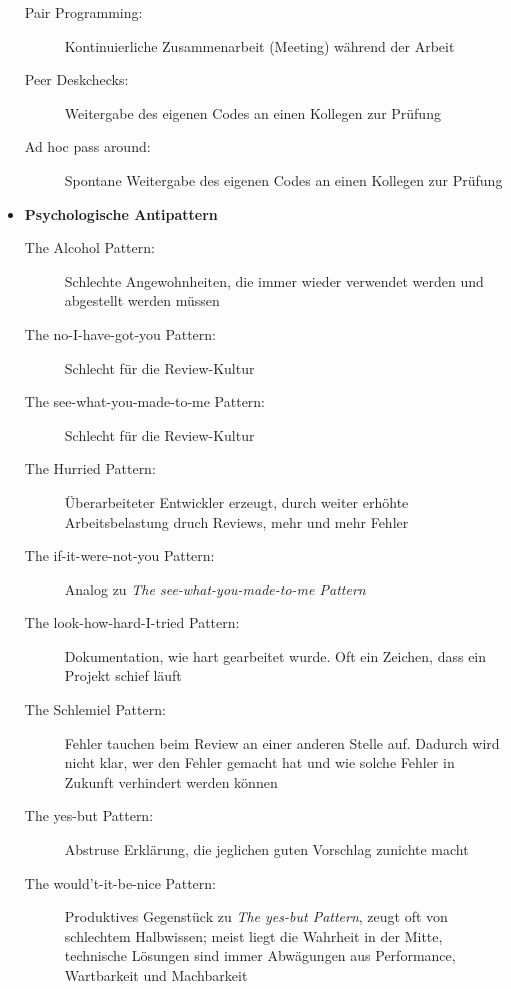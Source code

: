 \begin{itemize}
\begin{description}
		\item[Pair Programming:] Kontinuierliche Zusammenarbeit (Meeting) während der Arbeit
		\item[Peer Deskchecks:] Weitergabe des eigenen Codes an einen Kollegen zur Prüfung
		\item[Ad hoc pass around:] Spontane Weitergabe des eigenen Codes an einen Kollegen zur Prüfung
	\end{description}
	\item \textbf{Psychologische Antipattern}
	\begin{description}
		\item[The Alcohol Pattern:] Schlechte Angewohnheiten, die immer wieder verwendet werden und abgestellt werden müssen
		\item[The no-I-have-got-you Pattern:] Schlecht für die Review-Kultur
		\item[The see-what-you-made-to-me Pattern:] Schlecht für die Review-Kultur
		\item[The Hurried Pattern:] Überarbeiteter Entwickler erzeugt, durch weiter erhöhte Arbeitsbelastung druch Reviews, mehr und mehr Fehler
		\item[The if-it-were-not-you Pattern:] Analog zu \textit{The see-what-you-made-to-me Pattern}
		\item[The look-how-hard-I-tried Pattern:] Dokumentation, wie hart gearbeitet wurde. Oft ein Zeichen, dass ein Projekt schief läuft
		\item[The Schlemiel Pattern:] Fehler tauchen beim Review an einer anderen Stelle auf. Dadurch wird nicht klar, wer den Fehler gemacht hat und wie solche Fehler in Zukunft verhindert werden können
		\item[The yes-but Pattern:] Abstruse Erklärung, die jeglichen guten Vorschlag zunichte macht
		\item[The would't-it-be-nice Pattern:] Produktives Gegenstück zu \textit{The yes-but Pattern}, zeugt oft von schlechtem Halbwissen; meist liegt die Wahrheit in der Mitte, technische Lösungen sind immer Abwägungen aus Performance, Wartbarkeit und Machbarkeit
	\end{description}
\end{itemize}



